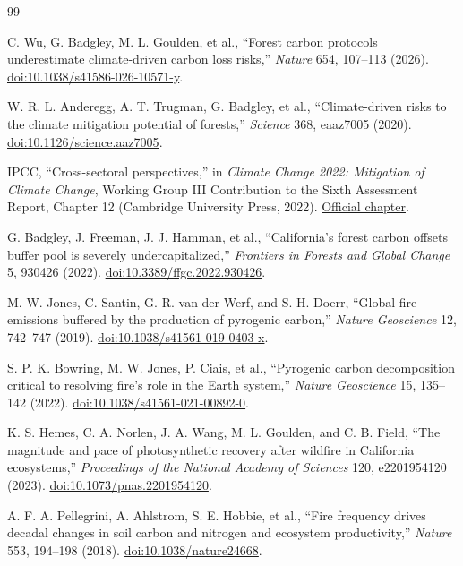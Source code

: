\documentclass[10pt]{article}
\begin{document}
\begin{thebibliography}{99}\small

C. Wu, G. Badgley, M. L. Goulden, et al., ``Forest carbon protocols
underestimate climate-driven carbon loss risks,'' \emph{Nature} 654, 107--113
(2026). \href{https://doi.org/10.1038/s41586-026-10571-y}{doi:10.1038/s41586-026-10571-y}.

W. R. L. Anderegg, A. T. Trugman, G. Badgley, et al., ``Climate-driven
risks to the climate mitigation potential of forests,'' \emph{Science} 368,
eaaz7005 (2020). \href{https://doi.org/10.1126/science.aaz7005}{doi:10.1126/science.aaz7005}.

IPCC, ``Cross-sectoral perspectives,'' in \emph{Climate Change 2022:
Mitigation of Climate Change}, Working Group III Contribution to the Sixth
Assessment Report, Chapter 12 (Cambridge University Press, 2022).
\href{https://www.ipcc.ch/report/ar6/wg3/chapter/chapter-12/}{Official chapter}.

G. Badgley, J. Freeman, J. J. Hamman, et al., ``California's forest carbon
offsets buffer pool is severely undercapitalized,'' \emph{Frontiers in Forests
and Global Change} 5, 930426 (2022).
\href{https://doi.org/10.3389/ffgc.2022.930426}{doi:10.3389/ffgc.2022.930426}.

M. W. Jones, C. Santin, G. R. van der Werf, and S. H. Doerr, ``Global fire
emissions buffered by the production of pyrogenic carbon,'' \emph{Nature
Geoscience} 12, 742--747 (2019).
\href{https://doi.org/10.1038/s41561-019-0403-x}{doi:10.1038/s41561-019-0403-x}.

S. P. K. Bowring, M. W. Jones, P. Ciais, et al., ``Pyrogenic carbon
decomposition critical to resolving fire's role in the Earth system,''
\emph{Nature Geoscience} 15, 135--142 (2022).
\href{https://doi.org/10.1038/s41561-021-00892-0}{doi:10.1038/s41561-021-00892-0}.

K. S. Hemes, C. A. Norlen, J. A. Wang, M. L. Goulden, and C. B. Field, ``The
magnitude and pace of photosynthetic recovery after wildfire in California
ecosystems,'' \emph{Proceedings of the National Academy of Sciences} 120,
e2201954120 (2023).
\href{https://doi.org/10.1073/pnas.2201954120}{doi:10.1073/pnas.2201954120}.

A. F. A. Pellegrini, A. Ahlstrom, S. E. Hobbie, et al., ``Fire frequency
drives decadal changes in soil carbon and nitrogen and ecosystem productivity,''
\emph{Nature} 553, 194--198 (2018).
\href{https://doi.org/10.1038/nature24668}{doi:10.1038/nature24668}.


\end{thebibliography}
\end{document}
